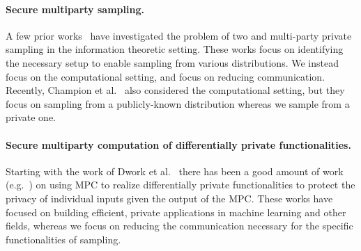 
\paragraph{Secure multiparty sampling.} 
A few prior works~\cite{prabhakaran2012secure,prabhakaran2014assisted} have investigated the problem of two and multi-party private sampling in the information theoretic setting.  These works focus on identifying the necessary setup to enable sampling from various distributions. We instead focus on the computational setting, and focus on reducing communication.
Recently, Champion et al.~\cite{CCS:ChasheUll19} also considered the computational setting, but they focus on sampling from a publicly-known distribution whereas we sample from a private one.


\paragraph{Secure multiparty computation of differentially private functionalities.} 
Starting with the work of Dwork et al.~\cite{dwork2006our} there has been a good amount of work (e.g.~\cite{acar2017achieving,clifton2013challenges,eriguchi2021efficient,goryczka2013secure,pathak2010multiparty,pentyala2022training}) on using MPC to realize differentially private functionalities to protect the privacy of individual inputs given the output of the MPC.  These works have focused on building efficient, private applications in machine learning and other fields, whereas we focus on reducing the communication necessary for the specific functionalities of sampling.  


